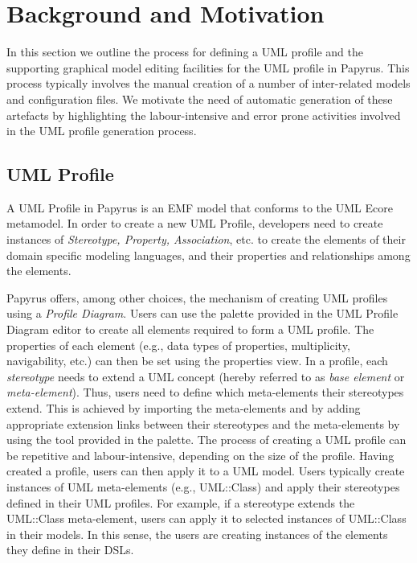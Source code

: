 \section{Background and Motivation}
\label{sec:background}

In this section we outline the process for defining a UML profile and the supporting graphical model editing facilities for the UML profile in Papyrus. 
This process typically involves the manual creation of a number of inter-related models and configuration files.
We motivate the need of automatic generation of these artefacts by highlighting the labour-intensive and error prone activities involved in the UML profile generation process.

\subsection{UML Profile}
A UML Profile in Papyrus is an EMF model that conforms to the UML Ecore metamodel. 
In order to create a new UML Profile, developers need to create instances of \textit{Stereotype, Property, Association}, etc. to create the elements of their domain specific modeling languages, and their properties and relationships among the elements.

Papyrus offers, among other choices, the mechanism of creating UML profiles using a \textit{Profile Diagram}. 
Users can use the palette provided in the UML Profile Diagram editor to
create all elements required to form a UML profile.
The properties of each element (e.g., data types of properties, multiplicity, navigability, etc.) can then be set using the properties view. 
In a profile, each \textit{stereotype} needs to extend a UML concept (hereby referred to as \textit{base element} or \textit{meta-element}). 
Thus, users need to define which meta-elements their stereotypes extend. 
This is achieved by importing the meta-elements and by adding appropriate extension links between their stereotypes and the meta-elements by using the tool provided in the palette.
The process of creating a UML profile can be repetitive and labour-intensive, depending on the size of the profile.
Having created a profile, users can then apply it to a UML model. 
Users typically create instances of UML meta-elements (e.g., UML::Class) and apply their stereotypes defined in their UML profiles. 
For example, if a stereotype extends the UML::Class meta-element, users can apply it to selected instances of UML::Class in their models. 
In this sense, the users are creating instances of the elements they define in their DSLs. 

